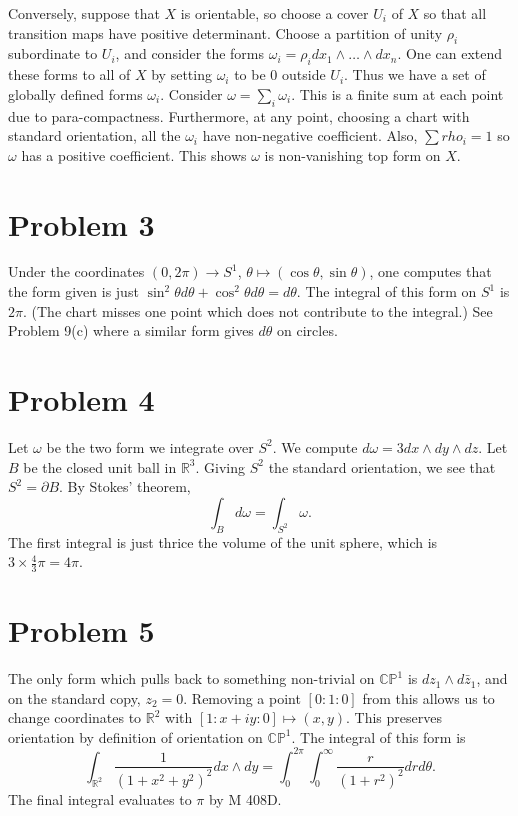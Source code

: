 \documentclass{amsart}
\numberwithin{equation}{section}
\theoremstyle{plain}
\theoremstyle{definition}
\theoremstyle{remark}
\renewcommand{\_}[2]{\underbrace{#1}_{#2}}
\renewcommand{\^}[2]{\overbrace{#1}_{#2}}
\newcommand{\R}{\mathbb{R}}
\renewcommand{\P}{\mathbb{P}}
\newcommand{\C}{\mathbb{C}}
\begin{document}
Conversely, suppose that $X$ is orientable, so choose a cover $U_i$ of $X$ so that all transition maps have positive determinant. Choose a partition of unity $\rho_i$ subordinate to $U_i$, and consider the forms $\omega_i = \rho_i dx_1 \wedge \dots \wedge dx_n$. One can extend these forms to all of $X$ by setting $\omega_i$ to be $0$ outside $U_i$. Thus we have a set of globally defined forms $\omega_i$. Consider $\omega = \sum_i \omega_i$. This is a finite sum at each point due to para-compactness. Furthermore, at any point, choosing a chart with standard orientation, all the $\omega_i$ have non-negative coefficient. Also, $\sum rho_i = 1$ so $\omega$ has a positive coefficient. This shows $\omega$ is non-vanishing top form on $X$.

\section*{Problem 3}
Under the coordinates $(0,2\pi) \to S^1$, $\theta \mapsto (\cos\theta, \sin \theta)$, one computes that the form given is just $\sin^2\theta d\theta + \cos^2 \theta d\theta = d\theta$. The integral of this form on $S^1$ is $2\pi$. (The chart misses one point which does not contribute to the integral.) See Problem 9(c) where a similar form gives $d\theta$ on circles.

\section*{Problem 4}

Let $\omega$ be the two form we integrate over $S^2$. We compute $d\omega = 3 dx\wedge dy \wedge dz$. Let $B$ be the closed unit ball in $\R^3$. Giving $S^2$ the standard orientation, we see that $S^2 = \partial B$. By Stokes' theorem, \[\int_B d\omega = \int_{S^2}\omega.\] The first integral is just thrice the volume of the unit sphere, which is $3\times \frac 43 \pi = 4\pi$.

\section*{Problem 5}
The only form which pulls back to something non-trivial on $\C\P^1$ is $dz_1 \wedge d\bar z_1$, and on the standard copy, $z_2= 0$. Removing a point $[0:1:0]$ from this allows us to change coordinates to $\R^2$ with $[1:x+iy:0] \mapsto (x,y)$. This preserves orientation by definition of orientation on $\C\P^1$. The integral of this form is \[\int_{\R^2} \frac{1}{(1+x^2+y^2)^2} dx\wedge dy = \int_0^{2\pi}\int_0^\infty \frac{r}{(1+r^2)^2} drd\theta.\] The final integral evaluates to $\pi$ by M 408D.
\end{document}
